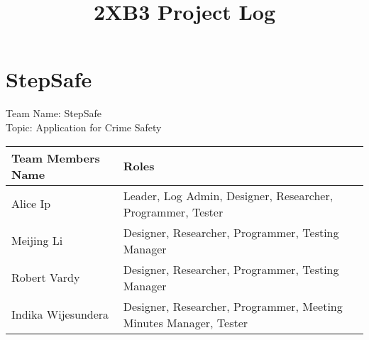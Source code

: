 \documentclass[10pt]{article}
\begin{document}
\title{2XB3 Project Log}
\maketitle

\section {StepSafe}
Team Name: StepSafe \\
Topic: Application for Crime Safety \\

 \begin{tabular}{|p{4cm}| p{10cm}|} 
 \hline
 Team Members Name & Roles \\
 \hline
  Alice Ip & Leader, Log Admin, Designer, Researcher, Programmer, Tester  \\
 \hline
  Meijing Li & Designer, Researcher, Programmer, Testing Manager  \\
 \hline
  Robert Vardy & Designer, Researcher, Programmer, Testing Manager  \\
 \hline
  Indika Wijesundera & Designer, Researcher, Programmer, Meeting Minutes Manager, Tester  \\
 \hline
 
\end{tabular} \\
\end{document}
